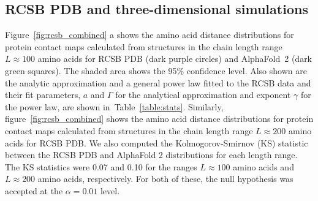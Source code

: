 \documentclass[10pt]{iopart}
\begin{document}
\begin{figure}[htb]
\end{figure}

\subsection{RCSB PDB and three-dimensional simulations}

Figure~\ref{fig:rcsb_combined} a shows the amino acid distance distributions for protein contact maps calculated from structures in the chain length range $L\approx100$ amino acids for RCSB PDB (dark purple circles) and AlphaFold~2 (dark green squares). The shaded area shows the 95\% confidence level. Also shown are the analytic approximation and a general power law fitted to the RCSB data and their fit parameters, $a$ and $\Gamma$ for the analytical approximation and exponent $\gamma$ for the power law,  are shown in~Table~\ref{table:stats}. Similarly, figure~\ref{fig:rcsb_combined} shows the amino acid distance distributions for protein contact maps calculated from structures in the chain length range $L\approx200$ amino acids for RCSB PDB. We also computed the Kolmogorov-Smirnov (KS) statistic between the RCSB PDB and AlphaFold 2 distributions for each length range. The KS statistics were 0.07 and 0.10 for the ranges $L\approx100$ amino acids and $L\approx200$ amino acids, respectively. For both of these, the null hypothesis was accepted at the $\alpha=0.01$ level.
\end{document}
